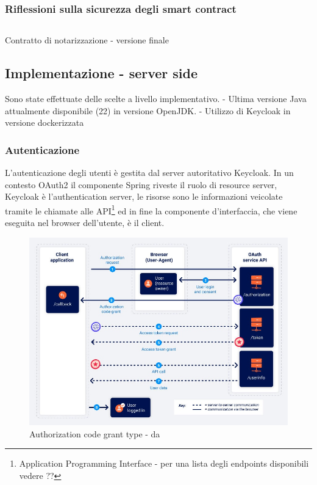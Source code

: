 \documentclass[a4paper,11pt]{article}
\newenvironment{longlisting}{\captionsetup{type=figure}}{}
\begin{document}
\subsubsection{Riflessioni sulla sicurezza degli smart contract}

\begin{longlisting}
  \inputminted{solidity}{./code/Hash.v2.sol}
  \caption{Contratto di notarizzazione - versione finale}
  \label{listing:hash2}
\end{longlisting}


\subsection{Implementazione - server side}

Sono state effettuate delle scelte a livello implementativo.
- Ultima versione Java attualmente disponibile (22) in versione OpenJDK.
- Utilizzo di Keycloak in versione dockerizzata


\subsubsection{Autenticazione}
L'autenticazione degli utenti è gestita dal server autoritativo Keycloak. In un contesto OAuth2 il componente Spring riveste il ruolo di resource server, Keycloak è l'authentication server, le risorse sono le informazioni veicolate tramite le chiamate alle API\footnote{Application Programming Interface - per una lista degli endpoints disponibili vedere ?? } ed in fine la componente d'interfaccia, che viene eseguita nel browser dell'utente, è il client.

\begin{figure}[H]
  \includegraphics[width=1\linewidth]{img/oauth-authorization-code-flow.jpg}
  \caption{Authorization code grant type - da \cite{portswiggerOAuthGrant}}
  \label{fig:flussoportswigger}
\end{figure}
\end{document}
